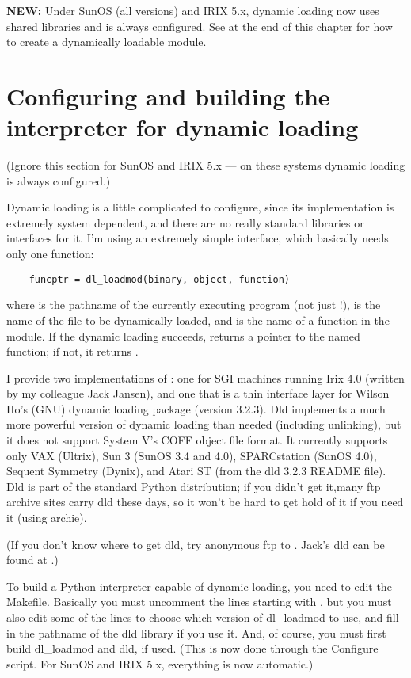 {\bf NEW:} Under SunOS (all versions) and IRIX 5.x, dynamic loading
now uses shared libraries and is always configured.  See at the
end of this chapter for how to create a dynamically loadable module.


\section{Configuring and building the interpreter for dynamic loading}

(Ignore this section for SunOS and IRIX 5.x --- on these systems
dynamic loading is always configured.)

Dynamic loading is a little complicated to configure, since its
implementation is extremely system dependent, and there are no
really standard libraries or interfaces for it.  I'm using an
extremely simple interface, which basically needs only one function:

\begin{verbatim}
    funcptr = dl_loadmod(binary, object, function)
\end{verbatim}

where  is the pathname of the currently executing program
(not just !),  is the name of the 
file to be dynamically loaded, and  is the name of a
function in the module.  If the dynamic loading succeeds,
 returns a pointer to the named function; if not, it
returns .

I provide two implementations of : one for SGI machines
running Irix 4.0 (written by my colleague Jack Jansen), and one that
is a thin interface layer for Wilson Ho's (GNU) dynamic loading
package  (version 3.2.3).  Dld implements a much more powerful
version of dynamic loading than needed (including unlinking), but it
does not support System V's COFF object file format.  It currently
supports only VAX (Ultrix), Sun 3 (SunOS 3.4 and 4.0), SPARCstation
(SunOS 4.0), Sequent Symmetry (Dynix), and Atari ST (from the dld
3.2.3 README file).  Dld is part of the standard Python distribution;
if you didn't get it,many ftp archive sites carry dld these days, so
it won't be hard to get hold of it if you need it (using archie).

(If you don't know where to get dld, try anonymous ftp to
.  Jack's dld
can be found at .)

To build a Python interpreter capable of dynamic loading, you need to
edit the Makefile.  Basically you must uncomment the lines starting
with , but you must also edit some of the lines to choose
which version of dl_loadmod to use, and fill in the pathname of the dld
library if you use it.  And, of course, you must first build
dl_loadmod and dld, if used.  (This is now done through the Configure
script.  For SunOS and IRIX 5.x, everything is now automatic.)


